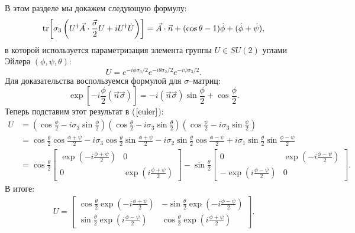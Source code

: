 
В этом разделе мы докажем следующую формулу:
\begin{equation}
	\label{eq:DPFormulaEuler}
	\mathrm{tr}\!\left[\sigma_3\left(U^\dagger \vec{A}\cdot\frac{\vec{\sigma}}{2} U + iU^\dagger \dot{U}\right)\right] = \vec{A}\cdot\vec{n} + (\cos{\theta} - 1)\dot{\phi} + (\dot{\phi} + \dot{\psi}),
\end{equation}
в которой используется параметризация элемента группы $U\in SU(2)$ углами Эйлера $(\phi, \psi, \theta)$:
\begin{equation}
	\label{euler}
	U = e^{-i \phi \sigma_3/2}e^{-i \theta \sigma_2/2}e^{-i \psi \sigma_3/2}.
\end{equation}
Для доказательства воспользуемся формулой для $\sigma$--матриц:
\begin{equation*}
	\exp{\left[-i \frac{\phi}{2} (\vec{n}\vec{\sigma})\right]}=-i(\vec{n}\vec{\sigma})\sin{\frac{\phi}{2}}+\cos{\frac{\phi}{2}}.
\end{equation*}
Теперь подставим этот результат в ($\ref{euler}$):
\begin{align*}
	U &= \left(\cos{\frac{\phi}{2}}-i \sigma_3\sin{\frac{\phi}{2}}\right)\left(\cos{\frac{\theta}{2}}-i \sigma_3\sin{\frac{\theta}{2}}\right)\left(\cos{\frac{\psi}{2}}-i \sigma_3\sin{\frac{\psi}{2}}\right)\\
	&= \cos{\frac{\theta}{2}}\cos{\frac{\phi+\psi}{2}} - i \sigma_3 \cos{\frac{\theta}{2}}\sin{\frac{\phi+\psi}{2}} - i \sigma_2 \sin{\frac{\theta}{2}}\cos{\frac{\phi-\psi}{2}} + i \sigma_1 \sin{\frac{\theta}{2}}\sin{\frac{\phi - \psi}{2}}\\
	&=\cos{\frac{\theta}{2}}
	\begin{bmatrix}
		\exp{\left(-i\frac{\phi+\psi}{2}\right)} & 0 \\
		0 & \exp{\left(i\frac{\phi+\psi}{2}\right)}
	\end{bmatrix}
	- \sin{\frac{\theta}{2}}
	\begin{bmatrix}
		0 & \exp{\left(-i\frac{\phi - \psi}{2}\right)} \\
		-\exp{\left(i\frac{\phi - \psi}{2}\right)} & 0
	\end{bmatrix}.
\end{align*}
В итоге:
\begin{align*}
	U = 
	\begin{bmatrix}
		\cos{\frac{\theta}{2}\exp{\left(-i\frac{\phi+\psi}{2}\right)}} & -\sin{\frac{\theta}{2}\exp{\left(-i\frac{\phi-\psi}{2}\right)}}\\[6pt]
		\sin{\frac{\theta}{2}\exp{\left(i\frac{\phi-\psi}{2}\right)}} & \cos{\frac{\theta}{2}\exp{\left(i\frac{\phi+\psi}{2}\right)}}
	\end{bmatrix}.
\end{align*}
